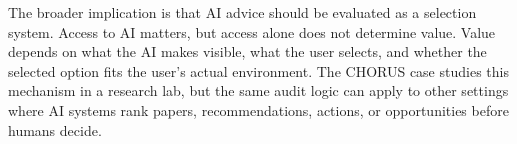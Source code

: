 \documentclass[11pt]{article}
\begin{document}
The broader implication is that AI advice should be evaluated as a selection system. Access to AI matters, but access alone does not determine value. Value depends on what the AI makes visible, what the user selects, and whether the selected option fits the user's actual environment. The CHORUS case studies this mechanism in a research lab, but the same audit logic can apply to other settings where AI systems rank papers, recommendations, actions, or opportunities before humans decide.



\end{document}
